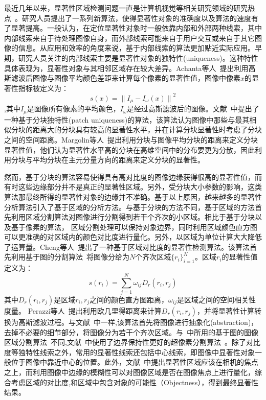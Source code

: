 最近几年以来，显著性区域检测问题一直是计算机视觉等相关研究领域的研究热点~\cite{saliencySurvey}。研究人员提出了一系列新算法，使得显著性对象的准确度以及算法的速度有了显著提高。一般认为，在定位显著性对象时一般依靠内部和外部两种线索\cite{saliencySurvey}，其中内部线索来自于待处理图像自身，而外部线索可能来自于用户交互或来自于其它图像的信息。从应用和效率的角度来说，基于内部线索的算法更加贴近实际应用。早期，研究人员关注的内部线索主要是显著性对象的独特性(uniqueness)。这种特性具体表现为，显著性对象与其相邻区域存在较大差异。Achanta等人~\cite{frequenyTuned}提出利用高斯滤波后图像与图像平均颜色差距来计算每个像素的显著性值，图像中像素$x$的显著性指标被定义为：
$$s(x)={\parallel I_{\mu }-I_{\omega}(x)\parallel}^{2}$$
,其中$I_{\mu }$是图像所有像素的平均颜色，$I_{\omega}$是经过高斯滤波后的图像。文献~中提出了一种基于分块独特性(patch uniqueness)的算法，该算法认为图像中那些与最其相似分块的距离大的分块具有较高的显著性水平，并在计算分块显著性时考虑了分块之间的空间距离。Margolin等人~\cite{whatmakes}提出利用分块与图像平均分块的距离来定义分块显著性值，他们认为显著性水平高的分块在高维空间中的分布要更为分散，因此利用分块与平均分块在主元分量方向的距离来定义分块的显著性。\par
然而，基于分块的算法容易使得具有高对比度的图像边缘获得很高的显著性值，而有时这些边缘部分并不是真正的显著性区域。另外，受分块大小参数的影响，这类算法那最终所得的显著性对象的边缘并不准确。基于以上原因，越来越多的显著性分析算法引入了基于区域的分析方法。与基于分块的方法不同，基于区域的方法首先利用区域分割算法对图像进行分割得到若干个齐次的小区域。相比于基于分块以及基于像素的算法， 区域分割处理可以保持对象边界，同时利用区域颜色直方图可以更准确的对区域内的颜色对比度进行量化。另外，以区域为单位计算大大降低了运算量。Cheng等人~\cite{ChengPAMI}提出了一种基于区域对比度的显著性检测算法。该算法首先利用基于图的分割算法~\cite{graphseg}将图像分给为$N$个齐次区域$\{r_{i}\}_{i=1}^{N}$。区域$r_{i}$的显著性值定义为：
$$s(r_{i})=\sum_{j=1}^{N}\omega_{ij}D_{r}(r_{i},r_{j})$$
其中$D_{r}(r_{i},r_{j})$是区域$r_{i},r_{j}$之间的颜色直方图距离，$\omega_{ij}$是区域之间的空间相关性度量。
Perazzi等人~\cite{saliencyFilter}提出利用欧几里得距离来计算$D_{r}(r_{i},r_{j})$，并将显著性计算转换为高斯滤波过程。与文献~\cite{ChengPAMI}中一样,该算法首先将图像进行抽象化(abstraction)，去掉不必要的细节部分，将图像分为若干个齐次区域。与~\cite{ChengPAMI}中所用的基于图的图像区域分割算法~\cite{graphseg}不同,文献~\cite{saliencyFilter}中使用了边界保持性更好的超像素分割算法~\cite{SLIC}。除了对比度等独特性线索之外，常用的显著性线索还包括中心线索，即图像中显著性对象一般位于图像中靠近中心的位置。此外，文献~中提出显著性区域应该在相机的焦点之上，而利用图像中边缘的模糊性可以对图像区域是否在图像焦点上进行量化，综合考虑区域的对比度,和区域中包含对象的可能性（Objectness），得到最终显著性结果。\par

